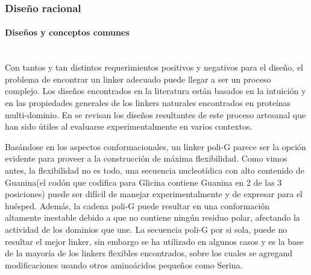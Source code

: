 \subsubsection{Diseño racional}

\paragraph{Diseños y conceptos comunes} \hspace{0pt} \\

Con tantos y tan distintos requerimientos positivos y negativos para el diseño, el problema de encontrar un linker adecuado puede llegar a ser un proceso complejo.
Los diseños encontrados en la literatura están basados en la intuición y en las propiedades generales de los linkers naturales encontrados en proteínas multi-dominio.
En \cite{chen2013fusion} se revisan los diseños resultantes de este proceso artesanal que han sido útiles al evaluarse experimentalmente en varios contextos.



Basándose en los aspectos conformacionales, un linker poli-G parece ser la opción evidente para proveer a la construcción de máxima flexibilidad.
Como vimos antes, la flexibilidad no es todo, una secuencia nucleotídica con alto contenido de Guanina(el codón que codifica para Glicina contiene Guanina en 2 de las 3 posiciones) 
puede ser difícil de manejar experimentalmente y de expresar para el huésped\cite{trinh2004optimization}.
Además, la cadena poli-G puede resultar en una conformación altamente inestable debido a que no contiene ningún residuo polar, afectando la actividad de los dominios que une\cite{robinson1998optimizing}. 
La secuencia poli-G por si sola, puede no resultar el mejor linker, sin embargo se ha utilizado en algunos casos\cite{iwakura1998effects,de2012characterization,sabourin2007flexible} y es la base de la mayoría de los linkers flexibles 
encontrados, sobre los cuales se agregand modificaciones usando otros aminoácidos pequeños como Serina.%

